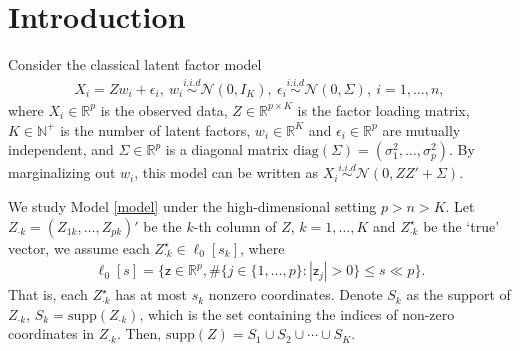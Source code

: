 \documentclass[pdftex]{imsart}
\theoremstyle{plain}
\begin{document}

\section{Introduction}
\label{sec:intro}

Consider the classical latent factor model 
\begin{align}
X_i = Z w_i + \epsilon_i, \
w_i \stackrel{i.i.d}{\sim} \mathcal{N}(0, I_K), \
\epsilon_i \stackrel{i.i.d}{\sim} \mathcal{N}(0, \Sigma), \ i = 1,\dots, n,
\label{model}
\end{align}
where $X_i \in \mathbb{R}^p$ is the observed data,
$Z \in \mathbb{R}^{p \times K}$ is the factor loading matrix,
$K \in \mathbb{N}^+$ is the number of latent factors, $w_i \in \mathbb{R}^{K}$ and $\epsilon_i \in \mathbb{R}^{p}$ are mutually independent, and $\Sigma \in \mathbb{R}^p$ is a diagonal matrix $\text{diag}(\Sigma) = (\sigma_1^2, \dots, \sigma_p^2)$. By marginalizing out $w_i$, this model can be written as $X_i \stackrel{i.i.d}{\sim} \mathcal{N}(0, ZZ' + \Sigma)$.


We study Model \eqref{model} under the high-dimensional setting $p > n > K$.
Let $Z_{\cdot k} = (Z_{1k}, \dots, Z_{pk})'$ be the $k$-th column of $Z$, $k = 1, \dots, K$
and $Z_{\cdot k}^\star$ be the `true' vector, we assume each $Z_{\cdot k}^\star \in \ell_0[s_k]$, where
\begin{align}
\label{l0}
\ell_0[s] = \{\mathsf{z} \in \mathbb{R}^p, \# \{j \in \{1, \dots, p\}: |\mathsf{z}_j| > 0\} \leq s \ll p\}.
\end{align}
That is, each $Z_{\cdot k}^\star$ has at most $s_k$ nonzero coordinates. Denote $S_k$ as the support of $Z_{\cdot k}$, $S_k = \text{supp}(Z_{\cdot k})$, which is the set containing the indices of non-zero coordinates in $Z_{\cdot k}$. Then, $\text{supp}(Z) = S_1 \cup S_2 \cup \cdots \cup S_K$. 
\end{document}
